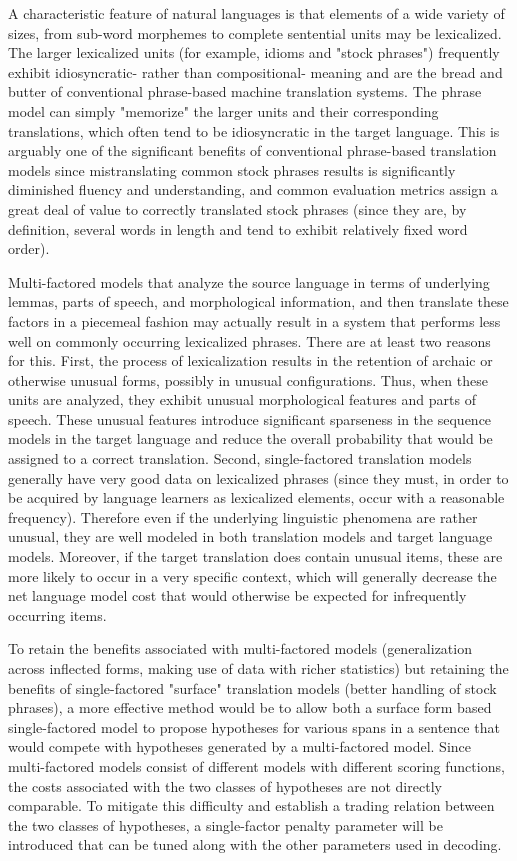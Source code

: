 \documentclass[10pt]{report}
\theoremstyle{plain}
\begin{document}
A characteristic feature of natural languages is that elements of a
wide variety of sizes, from sub-word morphemes to complete
sentential units may be lexicalized.  The larger lexicalized units
(for example, idioms and "stock phrases") frequently exhibit
idiosyncratic- rather than compositional- meaning and are the bread
and butter of conventional phrase-based machine translation systems.
The phrase model can simply "memorize" the larger units and their
corresponding translations, which often tend to be idiosyncratic in
the target language.  This is arguably one of the significant
benefits of conventional phrase-based translation models since
mistranslating common stock phrases results is significantly
diminished fluency and understanding, and common evaluation metrics
assign a great deal of value to correctly translated stock phrases
(since they are, by definition, several words in length and tend to
exhibit relatively fixed word order).

Multi-factored models that analyze the source language in terms of
underlying lemmas, parts of speech, and morphological information,
and then translate these factors in a piecemeal fashion may actually
result in a system that performs less well on commonly occurring
lexicalized phrases. There are at least two reasons for this. First,
the process of lexicalization results in the retention of archaic or
otherwise unusual forms, possibly in unusual configurations.  Thus,
when these units are analyzed, they exhibit unusual morphological
features and parts of speech.  These unusual features introduce
significant sparseness in the sequence models in the target language
and reduce the overall probability that would be assigned to a
correct translation.  Second, single-factored translation models
generally have very good data on lexicalized phrases (since they
must, in order to be acquired by language learners as lexicalized
elements, occur with a reasonable frequency).  Therefore even if the
underlying linguistic phenomena are rather unusual, they are well
modeled in both translation models and target language models.
Moreover, if the target translation does contain unusual items,
these are more likely to occur in a very specific context, which
will generally decrease the net language model cost that would
otherwise be expected for infrequently occurring items.

To retain the benefits associated with multi-factored models
(generalization across inflected forms, making use of data with
richer statistics) but retaining the benefits of single-factored
"surface" translation models (better handling of stock phrases), a
more effective method would be to allow both a surface form based
single-factored model to propose hypotheses for various spans in a
sentence that would compete with hypotheses generated by a
multi-factored model.  Since multi-factored models consist of
different models with different scoring functions, the costs
associated with the two classes of hypotheses are not directly
comparable.  To mitigate this difficulty and establish a trading
relation between the two classes of hypotheses, a single-factor
penalty parameter will be introduced that can be tuned along with
the other parameters used in decoding.
\end{document}
